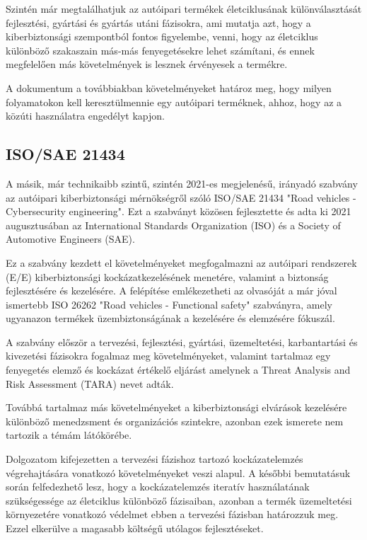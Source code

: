 Szintén már megtalálhatjuk az autóipari termékek életciklusának különválasztását fejlesztési, gyártási és gyártás utáni fázisokra, ami mutatja azt, hogy a kiberbiztonsági szempontból fontos figyelembe, venni, hogy az életciklus különböző szakaszain más-más fenyegetésekre lehet számítani, és ennek megfelelően más követelmények is lesznek érvényesek a termékre.

A dokumentum a továbbiakban követelményeket határoz meg, hogy milyen folyamatokon kell keresztülmennie egy autóipari terméknek, ahhoz, hogy az a közúti használatra engedélyt kapjon. 

\subsection{ISO/SAE 21434}

A másik, már technikaibb szintű, szintén 2021-es megjelenésű, irányadó szabvány az autóipari kiberbiztonsági mérnökségről szóló ISO/SAE 21434 "Road vehicles - Cybersecurity engineering"\cite{ISO21434}. Ezt a szabványt közösen fejlesztette és adta ki 2021 augusztusában az International Standards Organization (ISO) és a Society of Automotive Engineers (SAE).

Ez a szabvány kezdett el követelményeket megfogalmazni az autóipari rendszerek (E/E) kiberbiztonsági kockázatkezelésének menetére, valamint a biztonság fejlesztésére és kezelésére. A felépítése emlékezetheti az olvasóját a már jóval ismertebb ISO 26262 "Road vehicles - Functional safety" szabványra, amely ugyanazon termékek üzembiztonságának a kezelésére és elemzésére fókuszál.

A szabvány először a tervezési, fejlesztési, gyártási, üzemeltetési, karbantartási és kivezetési fázisokra fogalmaz meg követelményeket, valamint tartalmaz egy fenyegetés elemző és kockázat értékelő eljárást amelynek a Threat Analysis and Risk Assessment (TARA) nevet adták.

Továbbá tartalmaz más követelményeket a kiberbiztonsági elvárások kezelésére különböző menedzsment és organizációs szintekre, azonban ezek ismerete nem tartozik a témám látókörébe.

Dolgozatom kifejezetten a tervezési fázishoz tartozó kockázatelemzés végrehajtására vonatkozó követelményeket veszi alapul. A későbbi bemutatásuk során felfedezhető lesz, hogy a kockázatelemzés iteratív használatának szükségessége az életciklus különböző fázisaiban, azonban a termék üzemeltetési környezetére vonatkozó védelmet ebben a tervezési fázisban határozzuk meg. Ezzel elkerülve a magasabb költségű utólagos fejlesztéseket.

